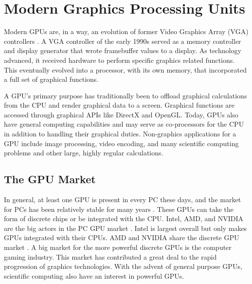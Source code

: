 \documentclass[../main/report.tex]{subfiles}
\begin{document}
\section{Modern Graphics Processing Units}


Modern GPUs are, in a way, an evolution of former Video Graphics Array (VGA) controllers \cite{gpu_appendix}.
A VGA controller of the early 1990s served as a memory controller and display generator that wrote framebuffer values to a display.
As technology advanced, it received hardware to perform specific graphics related functions.
This eventually evolved into a processor, with its own memory, that incorporated a full set of graphical functions.

A GPU's primary purpose has traditionally been to offload graphical calculations from the CPU and render graphical data to a screen.
Graphical functions are accessed through graphical APIs like DirectX and OpenGL.
Today, GPUs also have general computing capabilities and may serve as co-processors for the CPU in addition to handling their graphical duties.
Non-graphics applications for a GPU include image processing, video encoding, and many scientific computing problems and other large, highly regular calculations.


\subsection{The GPU Market}




In general, at least one GPU is present in every PC these days, and the market for PCs has been relatively stable for many years \cite{pc_sales}.
These GPUs can take the form of discrete chips or be integrated with the CPU.
Intel, AMD, and NVIDIA are the big actors in the PC GPU market \cite{gpu_overall_sales}.
Intel is largest overall but only makes GPUs integrated with their CPUs.
AMD and NVIDIA share the discrete GPU market \cite{gpu_discrete_sales}.
A big market for the more powerful discrete GPUs is the computer gaming industry.
This market has contributed a great deal to the rapid progression of graphics technologies.
With the advent of general purpose GPUs, scientific computing also have an interest in powerful GPUs.
\end{document}

